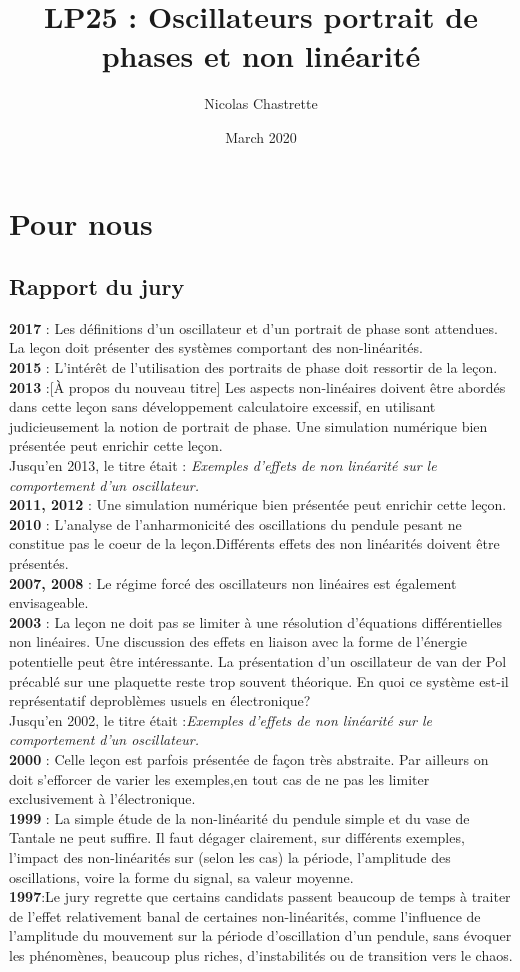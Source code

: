 \documentclass{article}
\title{LP25 : Oscillateurs portrait de phases et non linéarité}
\author{Nicolas Chastrette}
\date{March 2020}
\begin{document}
\maketitle
\section*{Pour nous}
\subsection*{Rapport du jury}
\textbf{2017} : Les  définitions  d'un  oscillateur  et  d'un  portrait  de  phase  sont  attendues.  La  leçon  doit  présenter  des  systèmes comportant des non-linéarités.\\
\textbf{2015} : L'intérêt de l'utilisation des portraits de phase doit ressortir de la leçon.\\
\textbf{2013} :[À propos du nouveau titre] Les aspects non-linéaires doivent être abordés dans cette leçon sans développement calculatoire excessif, en utilisant judicieusement la notion de portrait de phase. Une simulation numérique bien présentée peut enrichir cette leçon.\\
Jusqu’en 2013, le titre était : \textit{Exemples d’effets de non linéarité sur le comportement d’un oscillateur.}\\
\textbf{2011, 2012} : Une simulation numérique bien présentée peut enrichir cette leçon.\\
\textbf{2010} : L’analyse de l’anharmonicité des oscillations du pendule pesant ne constitue pas le coeur de la leçon.Différents effets des non linéarités doivent être présentés.\\
\textbf{2007, 2008} : Le régime forcé des oscillateurs non linéaires est également envisageable.\\
\textbf{2003} : La leçon ne doit pas se limiter à une résolution d’équations différentielles non linéaires. Une discussion des effets en liaison avec la forme de l’énergie potentielle peut être intéressante. La présentation d’un oscillateur de van der Pol précablé sur une plaquette reste trop souvent théorique. En quoi ce système est-il représentatif deproblèmes usuels en électronique?\\
Jusqu’en 2002, le titre était :\textit{Exemples d’effets de non linéarité sur le comportement d’un oscillateur.}\\
\textbf{2000} : Celle leçon est parfois présentée de façon très abstraite. Par ailleurs on doit s’efforcer de varier les exemples,en tout cas de ne pas les limiter exclusivement à l’électronique.\\
\textbf{1999} : La simple étude de la non-linéarité du pendule simple et du vase de Tantale ne peut suffire. Il faut dégager clairement, sur différents exemples, l’impact des non-linéarités sur (selon les cas) la période, l’amplitude des oscillations, voire la forme du signal, sa valeur moyenne.\\
\textbf{1997}:Le jury regrette que certains candidats passent beaucoup de temps à traiter de l’effet relativement banal de certaines non-linéarités, comme l’influence de l’amplitude du mouvement sur la période d’oscillation d’un pendule, sans évoquer les phénomènes, beaucoup plus riches, d’instabilités ou de transition vers le chaos.
\end{document}
